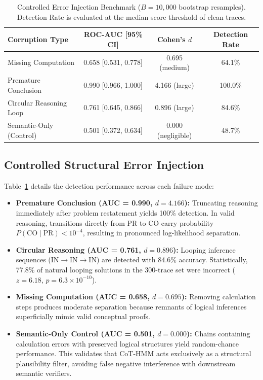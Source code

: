 \documentclass[runningheads]{llncs}
\begin{document}
\begin{table}[t]
\caption{Controlled Error Injection Benchmark ($B=10{,}000$ bootstrap resamples). Detection Rate is evaluated at the median score threshold of clean traces.}
\label{tab:main_results}
\centering
\begin{tabular}{lccc}
\toprule
\textbf{Corruption Type} & \textbf{ROC-AUC [95\% CI]} & \textbf{Cohen's $d$} & \textbf{Detection Rate} \\
\midrule
Missing Computation       & 0.658 [0.531, 0.778] & 0.695 (medium)     & 64.1\% \\
Premature Conclusion      & 0.990 [0.966, 1.000] & 4.166 (large)      & 100.0\% \\
Circular Reasoning Loop   & 0.761 [0.645, 0.866] & 0.896 (large)      & 84.6\% \\
Semantic-Only (Control)   & 0.501 [0.372, 0.634] & 0.000 (negligible) & 48.7\% \\
\bottomrule
\end{tabular}
\end{table}

\subsection{Controlled Structural Error Injection}

Table~\ref{tab:main_results} details the detection performance across each failure mode:
\begin{itemize}
    \item \textbf{Premature Conclusion (AUC = 0.990, $d = 4.166$):} Truncating reasoning immediately after problem restatement yields 100\% detection. In valid reasoning, transitions directly from PR to CO carry probability $P(\text{CO}\mid\text{PR}) < 10^{-4}$, resulting in pronounced log-likelihood separation.
    \item \textbf{Circular Reasoning (AUC = 0.761, $d = 0.896$):} Looping inference sequences (IN$\rightarrow$IN$\rightarrow$IN) are detected with 84.6\% accuracy. Statistically, 77.8\% of natural looping solutions in the 300-trace set were incorrect ($z=6.18$, $p=6.3\times 10^{-10}$).
    \item \textbf{Missing Computation (AUC = 0.658, $d = 0.695$):} Removing calculation steps produces moderate separation because remnants of logical inferences superficially mimic valid conceptual proofs.
    \item \textbf{Semantic-Only Control (AUC = 0.501, $d = 0.000$):} Chains containing calculation errors with preserved logical structures yield random-chance performance. This validates that CoT-HMM acts exclusively as a structural plausibility filter, avoiding false negative interference with downstream semantic verifiers.
\end{itemize}
\end{document}
